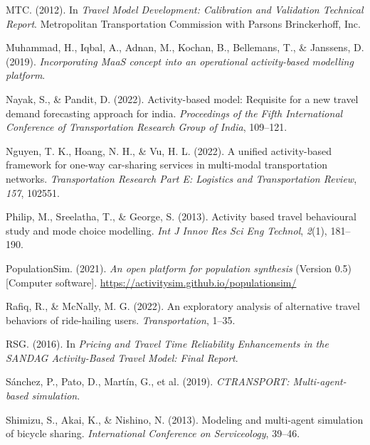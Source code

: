 \documentclass[fancy, masters]{byuthesis}
\newlength{\cslhangindent}
\newlength{\cslentryspacingunit} %
\newenvironment{CSLReferences}[2] %
 {%
  \setlength{\parindent}{0pt}
  \ifodd #1
  \let\oldpar\par
  \def\par{\hangindent=\cslhangindent\oldpar}
  \fi
  \setlength{\parskip}{#2\cslentryspacingunit}
 }%
 {}
\begin{document}
\begin{CSLReferences}{1}{0}
\leavevmode{}%
MTC. (2012). In \emph{Travel Model Development: Calibration and Validation Technical Report}. Metropolitan Transportation Commission with Parsons Brinckerhoff, Inc.

\leavevmode{}%
Muhammad, H., Iqbal, A., Adnan, M., Kochan, B., Bellemans, T., \& Janssens, D. (2019). \emph{Incorporating MaaS concept into an operational activity-based modelling platform}.

\leavevmode{}%
Nayak, S., \& Pandit, D. (2022). Activity-based model: Requisite for a new travel demand forecasting approach for india. \emph{Proceedings of the Fifth International Conference of Transportation Research Group of India}, 109--121.

\leavevmode{}%
Nguyen, T. K., Hoang, N. H., \& Vu, H. L. (2022). A unified activity-based framework for one-way car-sharing services in multi-modal transportation networks. \emph{Transportation Research Part E: Logistics and Transportation Review}, \emph{157}, 102551.

\leavevmode{}%
Philip, M., Sreelatha, T., \& George, S. (2013). Activity based travel behavioural study and mode choice modelling. \emph{Int J Innov Res Sci Eng Technol}, \emph{2}(1), 181--190.

\leavevmode{}%
PopulationSim. (2021). \emph{An open platform for population synthesis} (Version 0.5) {[}Computer software{]}. \url{https://activitysim.github.io/populationsim/}

\leavevmode{}%
Rafiq, R., \& McNally, M. G. (2022). An exploratory analysis of alternative travel behaviors of ride-hailing users. \emph{Transportation}, 1--35.

\leavevmode{}%
RSG. (2016). In \emph{Pricing and Travel Time Reliability Enhancements in the SANDAG Activity-Based Travel Model: Final Report}.

\leavevmode{}%
Sánchez, P., Pato, D., Martín, G., et al. (2019). \emph{CTRANSPORT: Multi-agent-based simulation}.

\leavevmode{}%
Shimizu, S., Akai, K., \& Nishino, N. (2013). Modeling and multi-agent simulation of bicycle sharing. \emph{International Conference on Serviceology}, 39--46.


\end{CSLReferences}
\end{document}
